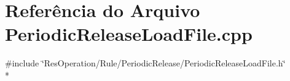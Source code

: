 \section{Referência do Arquivo Periodic\+Release\+Load\+File.\+cpp}
\label{_rule_2_periodic_release_2_periodic_release_load_file_8cpp}
{\ttfamily \#include \char`\"{}Res\+Operation/\+Rule/\+Periodic\+Release/\+Periodic\+Release\+Load\+File.\+h\char`\"{}}\\*
